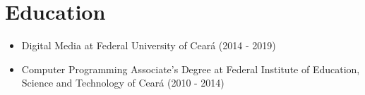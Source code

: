 \section{Education}

\begin{itemize}
  \item Digital Media at Federal University of Ceará (2014 - 2019)
  \item Computer Programming Associate's Degree at Federal Institute of Education, Science and Technology of Ceará (2010 - 2014)
\end{itemize}